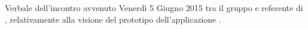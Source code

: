 Verbale dell'incontro avvenuto Venerdì 5 Giugno 2015 tra il gruppo \gruppo e  referente di \proponente, relativamente alla visione del prototipo dell'applicazione \progetto.
